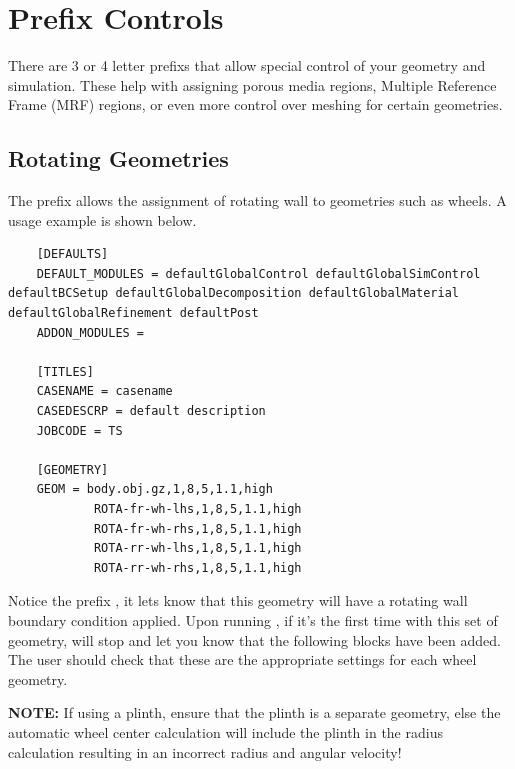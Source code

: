 \section{Prefix Controls}
There are 3 or 4 letter prefixs that allow special control of your geometry and simulation. These help with assigning porous media regions, Multiple Reference Frame (MRF) regions, or even more control over meshing for certain geometries.

\subsection{Rotating Geometries}
The  prefix allows the assignment of rotating wall to geometries such as wheels. A usage example is shown below.
\begin{lstlisting}
    [DEFAULTS]
    DEFAULT_MODULES = defaultGlobalControl defaultGlobalSimControl defaultBCSetup defaultGlobalDecomposition defaultGlobalMaterial defaultGlobalRefinement defaultPost
    ADDON_MODULES =

    [TITLES]
    CASENAME = casename
    CASEDESCRP = default description
    JOBCODE = TS

    [GEOMETRY]
    GEOM = body.obj.gz,1,8,5,1.1,high
            ROTA-fr-wh-lhs,1,8,5,1.1,high
            ROTA-fr-wh-rhs,1,8,5,1.1,high
            ROTA-rr-wh-lhs,1,8,5,1.1,high
            ROTA-rr-wh-rhs,1,8,5,1.1,high
\end{lstlisting}
Notice the prefix , it lets  know that this geometry will have a rotating wall boundary condition applied. Upon running , if it's the first time with this set of geometry,  will stop and let you know that the following blocks have been added. The user should check that these are the appropriate settings for each wheel geometry.

\textbf{NOTE:} If using a plinth, ensure that the plinth is a separate geometry, else the automatic wheel center calculation will include the plinth in the radius calculation resulting in an incorrect radius and angular velocity!

